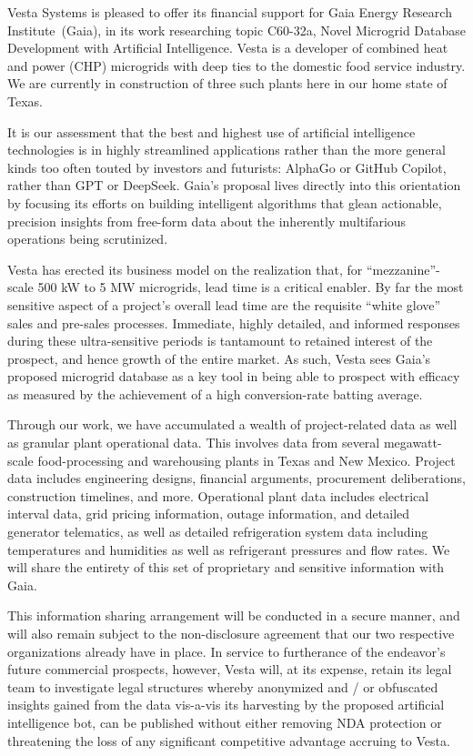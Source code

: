 \documentclass{vestaletter}
\def\Bidder{Gaia Energy Research Institute}
\def\BidderShort{Gaia}
\def\Topic{C60}
\def\Subtopic{32a}
\def\TopicDescription{Novel Microgrid Database Development with Artificial Intelligence}
\begin{document}
Vesta Systems is pleased to offer its financial support for \Bidder\ (\BidderShort), in its work researching topic \Topic-\Subtopic, \TopicDescription. Vesta is a developer of combined heat and power (CHP) microgrids with deep ties to the domestic food service industry. We are currently in construction of three such plants here in our home state of Texas.

It is our assessment that the best and highest use of artificial intelligence technologies is in highly streamlined applications rather than the more general kinds too often touted by investors and futurists: AlphaGo or GitHub Copilot, rather than GPT or DeepSeek. \BidderShort's proposal lives directly into this orientation by focusing its efforts on building intelligent algorithms that glean actionable, precision insights from free-form data about the inherently multifarious operations being scrutinized. 

Vesta has erected its business model on the realization that, for ``mezzanine''-scale 500 kW to 5 MW microgrids, lead time is a critical enabler. By far the most sensitive aspect of a project's overall lead time are the requisite ``white glove'' sales and pre-sales processes. Immediate, highly detailed, and informed responses during these ultra-sensitive periods is tantamount to retained interest of the prospect, and hence growth of the entire market. As such, Vesta sees \BidderShort's proposed microgrid database as a key tool in being able to prospect with efficacy as measured by the achievement of a high conversion-rate batting average.

Through our work, we have accumulated a wealth of project-related data as well as granular plant operational data. This involves data from several megawatt-scale food-processing and warehousing plants in Texas and New Mexico. Project data includes engineering designs, financial arguments, procurement deliberations, construction timelines, and more. Operational plant data includes electrical interval data, grid pricing information, outage information, and detailed generator telematics, as well as detailed refrigeration system data including temperatures and humidities as well as refrigerant pressures and flow rates. We will share the entirety of this set of proprietary and sensitive information with \BidderShort.

This information sharing arrangement will be conducted in a secure manner, and will also remain subject to the non-disclosure agreement that our two respective organizations already have in place. In service to furtherance of the endeavor's future commercial prospects, however, Vesta will, at its expense, retain its legal team to investigate legal structures whereby anonymized and / or obfuscated insights gained from the data vis-a-vis its harvesting by the proposed artificial intelligence bot, can be published without either removing NDA protection or threatening the loss of any significant competitive advantage accruing to Vesta. 
\end{document}
